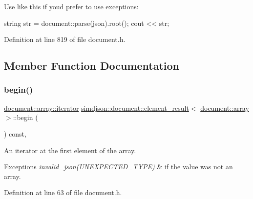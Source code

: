 Use like this if you\textquotesingle{}d prefer to use exceptions\+: \begin{DoxyVerb}string str = document::parse(json).root();
cout << str;\end{DoxyVerb}
 

Definition at line 819 of file document.\+h.



\subsection{Member Function Documentation}
\mbox{\label{classsimdjson_1_1document_1_1element__result_3_01document_1_1array_01_4_a3a97675726baee86118f283d5e2d4941}} 
\subsubsection{\texorpdfstring{begin()}{begin()}}
{\footnotesize\ttfamily \hyperlink{classsimdjson_1_1document_1_1array_1_1iterator}{document\+::array\+::iterator} \hyperlink{classsimdjson_1_1document_1_1element__result}{simdjson\+::document\+::element\+\_\+result}$<$ \hyperlink{classsimdjson_1_1document_1_1array}{document\+::array} $>$\+::begin (\begin{DoxyParamCaption}{ }\end{DoxyParamCaption}) const\hspace{0.3cm}{\ttfamily [inline]}, {\ttfamily [noexcept]}}



An iterator at the first element of the array. 


\begin{DoxyExceptions}{Exceptions}
{\em invalid\+\_\+json(\+U\+N\+E\+X\+P\+E\+C\+T\+E\+D\+\_\+\+T\+Y\+P\+E)} & if the value was not an array. \\
\hline
\end{DoxyExceptions}


Definition at line 63 of file document.\+h.


